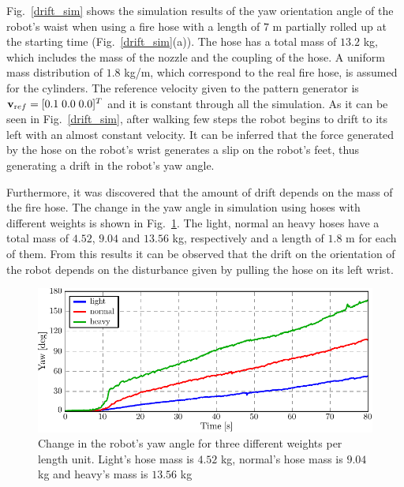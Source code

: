 Fig.~\ref{drift_sim} shows the simulation results of the yaw orientation angle of the robot's waist when using a fire hose with a length of $7$ m partially rolled up at the starting time (Fig.~\ref{drift_sim}(a)).
%
The hose has a total mass of $13.2$ kg, which includes the mass of the nozzle and the coupling of the hose.
%
A uniform mass distribution of $1.8$ kg/m, which correspond to the real fire hose, is assumed for the cylinders.
%
The reference velocity given to the pattern generator is $\mathbf v_{\text ref} = [0.1 \; 0.0 \; 0.0]^T$ and it is constant through all the simulation.
%
As it can be seen in Fig.~\ref{drift_sim}, after walking few steps the robot begins to drift to its left with an almost constant velocity.
%
It can be inferred that the force generated by the hose on the robot's wrist generates a slip on the robot's feet, thus generating a drift in the robot's yaw angle.
%


Furthermore, it was discovered that the amount of drift depends on the mass of the fire hose.
%
The change in the yaw angle in simulation using hoses with different weights is shown in Fig.~\ref{drift_sim2}.
%
The light, normal an heavy hoses have a total mass of $4.52$, $9.04$ and $13.56$ kg, respectively and a length of $1.8$ m for each of them.
%
From this results it can be observed that the drift on the orientation of the robot depends on the disturbance given by pulling the hose on its left wrist.
%
%
\begin{figure}[t]
 \centering
 \includegraphics[height=0.3\textwidth]{./figures/yaw_drifts_3weights.pdf}
 \vspace{-3mm}
 \caption{Change in the robot's yaw angle for three different weights per length unit. Light's hose mass is $4.52$ kg, normal's hose mass is $9.04$ kg and heavy's mass is $13.56$ kg}
 \label{drift_sim2}
\end{figure}


